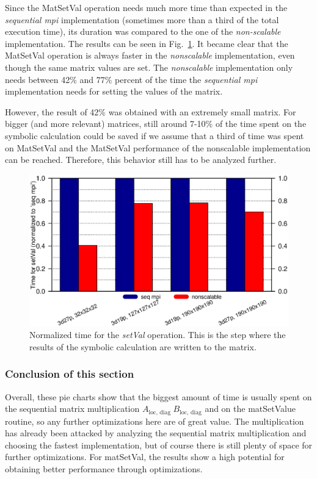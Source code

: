 Since the MatSetVal operation needs much more time than expected in the \textit{sequential mpi} implementation (sometimes more than a third of the total execution time), its duration was compared to the one of the \textit{non-scalable} implementation. The results can be seen in Fig.~\ref{fig:setvalues}. It became clear that the {MatSetVal} operation is always faster in the \textit{nonscalable} implementation, even though the same matrix values are set. The \textit{nonscalable} implementation only needs between 42\% and 77\% percent of the time the \textit{sequential mpi} implementation needs for setting the values of the matrix. 

However, the result of 42\% was obtained with an extremely small matrix. For bigger (and more relevant) matrices, still around 7-10\% of the time spent on the symbolic calculation could be saved if we assume that a third of time was spent on {MatSetVal} and the {MatSetVal} performance of the {nonscalable} implementation can be reached.  Therefore, this behavior still has to be analyzed further.


\begin{figure}[tbp]
	\centering
	\includegraphics[width=1\textwidth, trim={0 2cm 0 7cm},clip]{setvalues}
	\caption{Normalized time for the \textit{setVal} operation. This is the step where the results of the symbolic calculation are written to the matrix.} 
	\label{fig:setvalues}
\end{figure}

\subsubsection*{Conclusion of this section}
Overall, these pie charts show that the biggest amount of time is usually spent on the sequential matrix multiplication $A_{\textrm{loc, diag~}} B_{\textrm{loc, diag}}$ and on the matSetValue routine, so any further optimizations here are of great value. The multiplication has already been attacked by analyzing the sequential matrix multiplication and choosing the fastest implementation, but of course there is still plenty of space for further optimizations. For matSetVal, the results show a high potential for obtaining better performance through optimizations.


